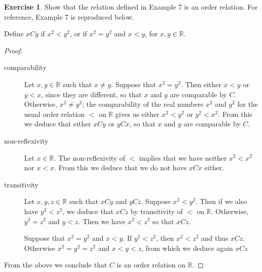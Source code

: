 \documentclass[11pt,a4paper,twoside]{article}
\theoremstyle{definition}
\newcounter{excounter}
\newtheorem{exercise}[excounter]{Exercise}
\begin{document}
\begin{exercise}

  Show that the relation defined in Example 7 is an order relation.
  For reference, Example 7 is reproduced below.

  Define $x C y$ if $x^2 < y^2$, or if $x^2 = y^2$ and $x < y$, for $x, y \in \mathbb{R}$.

\end{exercise}

\begin{proof}\hfill

  \begin{description}

  \item [comparability] Let $x, y \in \mathbb{R}$ such that $x \neq y$.
    Suppose that $x^2 = y^2$. Then either $x < y$ or $y < x$, since they are different, so that $x$ and $y$ are comparable by $C$.
    Otherwise, $x^2 \neq y^2$; the comparability of the real numbers $x^2$ and $y^2$ for the usual order relation $<$ on $\mathbb{R}$ gives us
    either $x^2 < y^2$ or $y^2 < x^2$. From this we deduce that either $x C y$ or $y C x$, so that $x$ and $y$ are comparable by $C$.

  \item [non-reflexivity] Let $x \in \mathbb{R}$. The non-reflexivity of $<$ implies that we have neither $x^2 < x^2$ nor $x < x$.
    From this we deduce that we do not have $x C x$ either.

  \item [transitivity] Let $x, y, z \in \mathbb{R}$ such that $x C y$ and $y C z$.
    Suppose $x^2 < y^2$. Then if we also have $y^2 < z^2$, we deduce that $x C z$ by transitivity of $<$ on $\mathbb{R}$.
    Otherwise, $y^2 = z^2$ and $y < z$. Then we have $x^2 < z^2$ so that $x C z$.

    Suppose that $x^2 = y^2$ and $x < y$. If $y^2 < z^2$, then $x^2 < z^2$ and thus $x C z$.
    Otherwise $x^2 = y^2 = z^2$ and $x < y < z$, from which we deduce again $x C z$

  \end{description}

  From the above we conclude that $C$ is an order relation on $\mathbb{R}$.

\end{proof}
\end{document}
